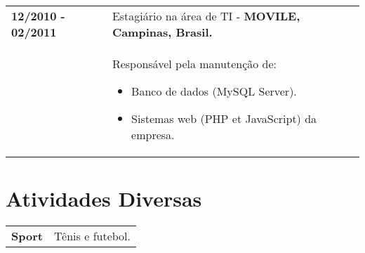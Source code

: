 \documentclass[10pt, a4paper]{article}
\begin{document}
\begin{tabular}{p{} p{}}
 
 \textbf{12/2010 - 02/2011} & Estagiário na área de TI - \textbf{MOVILE,
 Campinas, Brasil.}
 \\  & Responsável pela manutenção de: \vspace{-8pt}
 \begin{itemize}
   \item Banco de dados (MySQL Server). \vspace{-8pt}
   \item Sistemas web (PHP et JavaScript) da empresa.
 \end{itemize} 
\end{tabular}


\section{Atividades Diversas}

\begin{tabular}{p{} p{}}

\textbf{Sport} & Tênis e futebol. \\ 

\end{tabular}

\end{document}
